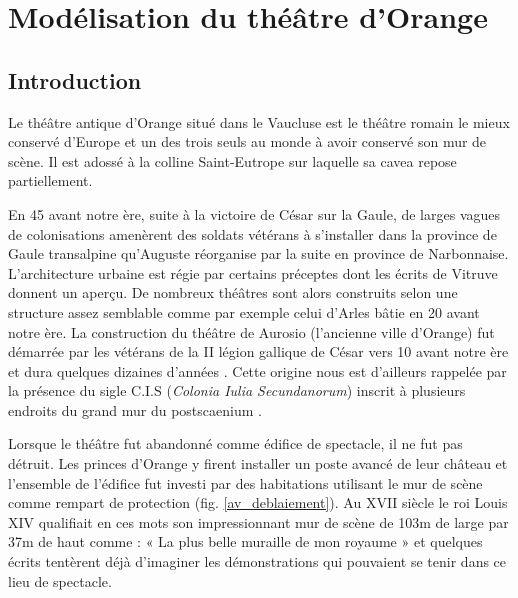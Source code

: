 \part{Modélisation du théâtre d’Orange}

	\chapter*{Introduction}
	  \label{introarcheo}
	 
			 Le théâtre antique d'Orange situé dans le Vaucluse est le théâtre romain le mieux conservé d'Europe et un des trois seuls au monde à avoir conservé son mur de scène. Il est adossé à la colline Saint-Eutrope sur laquelle sa \gls{cavea} repose partiellement.
			 
			 En 45 avant notre ère, suite à la victoire de César sur la Gaule, de larges vagues de colonisations amenèrent des soldats vétérans à s'installer dans la province de Gaule transalpine qu'Auguste réorganise par la suite en province de Narbonnaise. L'architecture urbaine est régie par certains préceptes dont les écrits de Vitruve \cite[Livre V]{vitruve} donnent un aperçu. De nombreux théâtres sont alors construits selon une structure assez semblable comme par exemple celui d'Arles bâtie en 20 avant notre ère. La construction du théâtre de Aurosio (l'ancienne ville d'Orange) fut démarrée par les vétérans de la II légion gallique de César vers 10 avant notre ère et dura quelques dizaines d'années \cite[p. 31]{PouvoirDuTheatre}. Cette origine nous est d'ailleurs rappelée par la présence du sigle C.I.S (\textit{Colonia Iulia Secundanorum}) inscrit à plusieurs endroits du grand mur du \gls{postscaenium} \cite[p26]{formige}.
			 
			 Lorsque le théâtre fut abandonné comme édifice de spectacle, il ne fut pas détruit. Les princes d'Orange y firent installer un poste avancé de leur château et l’ensemble de l’édifice fut investi par des habitations utilisant le mur de scène comme rempart de protection (fig. \ref{av_deblaiement}). Au XVII siècle le roi Louis XIV qualifiait en ces mots son impressionnant mur de scène de 103m de large par 37m de haut comme : « La plus belle muraille de mon royaume » et quelques écrits tentèrent déjà d'imaginer les démonstrations qui pouvaient se tenir dans ce lieu de spectacle. 
			 
